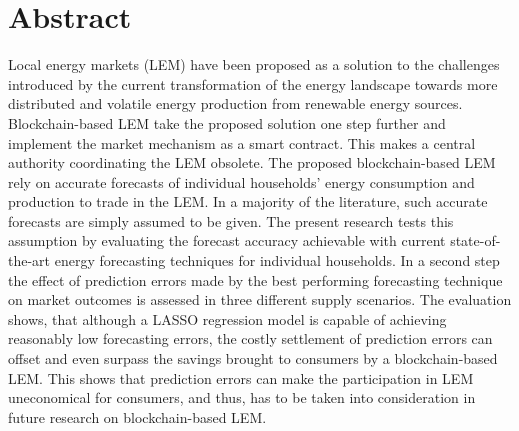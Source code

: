 \section*{Abstract}

Local energy markets (LEM) have been proposed as a solution to the challenges introduced by the current transformation of the energy landscape towards more distributed and volatile energy production from renewable energy sources. Blockchain-based LEM take the proposed solution one step further and implement the market mechanism as a smart contract. This makes a central authority coordinating the LEM obsolete. The proposed blockchain-based LEM rely on accurate forecasts of individual households' energy consumption and production to trade in the LEM. In a majority of the literature, such accurate forecasts are simply assumed to be given. The present research tests this assumption by evaluating the forecast accuracy achievable with current state-of-the-art energy forecasting techniques for individual households. In a second step the effect of prediction errors made by the best performing forecasting technique on market outcomes is assessed in three different supply scenarios. The evaluation shows, that although a LASSO regression model is capable of achieving reasonably low forecasting errors, the costly settlement of prediction errors can offset and even surpass the savings brought to consumers by a blockchain-based LEM. This shows that prediction errors can make the participation in LEM uneconomical for consumers, and thus, has to be taken into consideration in future research on blockchain-based LEM.

